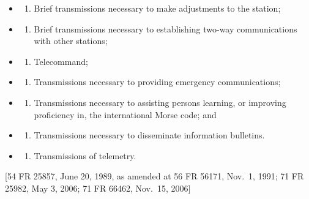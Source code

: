 \documentclass[
  letterpaper,
  DIV=11,
  numbers=noendperiod]{scrreport}
\providecommand{\tightlist}{%
  \setlength{\itemsep}{0pt}\setlength{\parskip}{0pt}}\usepackage{longtable,booktabs,array}
\begin{document}
\begin{itemize}
\item
  \begin{enumerate}
  \def\labelenumi{(\arabic{enumi})}
  \tightlist
  \item
    Brief transmissions necessary to make adjustments to the station;
  \end{enumerate}
\item
  \begin{enumerate}
  \def\labelenumi{(\arabic{enumi})}
  \setcounter{enumi}{1}
  \tightlist
  \item
    Brief transmissions necessary to establishing two-way communications
    with other stations;
  \end{enumerate}
\item
  \begin{enumerate}
  \def\labelenumi{(\arabic{enumi})}
  \setcounter{enumi}{2}
  \tightlist
  \item
    Telecommand;
  \end{enumerate}
\item
  \begin{enumerate}
  \def\labelenumi{(\arabic{enumi})}
  \setcounter{enumi}{3}
  \tightlist
  \item
    Transmissions necessary to providing emergency communications;
  \end{enumerate}
\item
  \begin{enumerate}
  \def\labelenumi{(\arabic{enumi})}
  \setcounter{enumi}{4}
  \tightlist
  \item
    Transmissions necessary to assisting persons learning, or improving
    proficiency in, the international Morse code; and
  \end{enumerate}
\item
  \begin{enumerate}
  \def\labelenumi{(\arabic{enumi})}
  \setcounter{enumi}{5}
  \tightlist
  \item
    Transmissions necessary to disseminate information bulletins.
  \end{enumerate}
\item
  \begin{enumerate}
  \def\labelenumi{(\arabic{enumi})}
  \setcounter{enumi}{6}
  \tightlist
  \item
    Transmissions of telemetry.
  \end{enumerate}
\end{itemize}

{[}54 FR 25857, June 20, 1989, as amended at 56 FR 56171, Nov.~1, 1991;
71 FR 25982, May 3, 2006; 71 FR 66462, Nov.~15, 2006{]}
\end{document}
